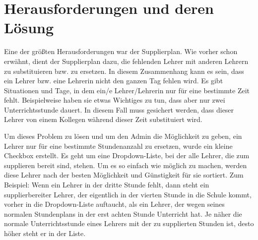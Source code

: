 \section{Herausforderungen und deren Lösung}

Eine der größten Herausforderungen war der Supplierplan. Wie vorher schon erwähnt, dient der Supplierplan  dazu, die fehlenden Lehrer mit anderen Lehrern zu substituieren bzw. zu ersetzen. In diesem Zusammenhang kann es sein, dass ein Lehrer bzw. eine Lehrerin nicht den ganzen Tag fehlen wird. Es gibt Situationen und Tage, in dem ein/e Lehrer/Lehrerin nur für eine bestimmte Zeit fehlt. Beispielweise haben sie etwas Wichtiges zu tun, dass aber nur zwei Unterrichtsstunde dauert. In diesem Fall muss gesichert werden, dass dieser Lehrer von einem Kollegen während dieser Zeit substituiert wird.


Um dieses Problem zu lösen und um den Admin die Möglichkeit zu geben, ein Lehrer nur für eine bestimmte Stundenanzahl zu ersetzen, wurde ein kleine Checkbox erstellt. Es geht um eine Dropdown-Liste, bei der alle Lehrer, die zum supplieren bereit sind, stehen. Um es so einfach wie möglich zu machen, werden diese Lehrer nach der besten Möglichkeit und Günstigkeit für sie sortiert. Zum Beispiel:  Wenn ein Lehrer in der dritte Stunde fehlt, dann steht ein supplierbereiter Lehrer, der eigentlich in der vierten Stunde in die Schule kommt, vorher in die Dropdown-Liste auftaucht, als ein Lehrer, der wegen seines normalen Stundenplans in der erst achten Stunde Unterricht hat. Je näher die normale Unterrichtsstunde eines Lehrers mit der zu supplierten Stunden ist, desto höher steht er in der Liste.
